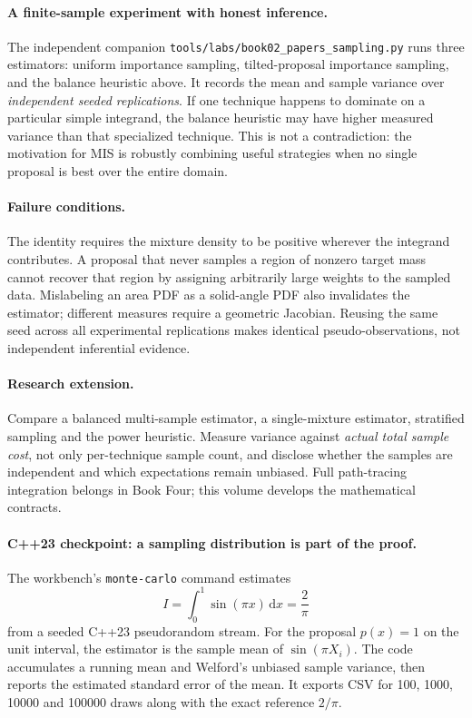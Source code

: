 \paragraph{A finite-sample experiment with honest inference.}
The independent companion
\texttt{tools/labs/book02\_papers\_sampling.py}
runs three estimators: uniform importance sampling,
tilted-proposal importance sampling, and the balance
heuristic above. It records the mean and sample variance
over \emph{independent seeded replications}.
If one technique happens to dominate on a particular
simple integrand, the balance heuristic may have
higher measured variance than that specialized technique.
This is not a contradiction: the motivation for MIS is
robustly combining useful strategies when no single
proposal is best over the entire domain.

\paragraph{Failure conditions.}
The identity requires the mixture density to be
positive wherever the integrand contributes.
A proposal that never samples a region of nonzero target
mass cannot recover that region by assigning arbitrarily
large weights to the sampled data. Mislabeling an area
PDF as a solid-angle PDF also invalidates the estimator;
different measures require a geometric Jacobian.
Reusing the same seed across all experimental
replications makes identical pseudo-observations,
not independent inferential evidence.

\paragraph{Research extension.}
Compare a balanced multi-sample estimator, a
single-mixture estimator, stratified sampling and
the power heuristic. Measure variance against
\emph{actual total sample cost}, not only per-technique
sample count, and disclose whether the samples are
independent and which expectations remain unbiased.
Full path-tracing integration belongs in Book Four;
this volume develops the mathematical contracts.


\begin{booktwolab}
\paragraph{C++23 checkpoint: a sampling distribution is part of the proof.}
The workbench's \texttt{monte-carlo} command estimates
\[
 I=\int_0^1\sin(\pi x)\,\mathrm{d}x=\frac{2}{\pi}
\]
from a seeded C++23 pseudorandom stream. For the proposal
\(p(x)=1\) on the unit interval, the estimator is the sample
mean of \(\sin(\pi X_i)\). The code accumulates a running mean
and Welford's unbiased sample variance, then reports the estimated
standard error of the mean. It exports CSV for 100, 1000, 10000 and
100000 draws along with the exact reference \(2/\pi\).

\end{booktwolab}

